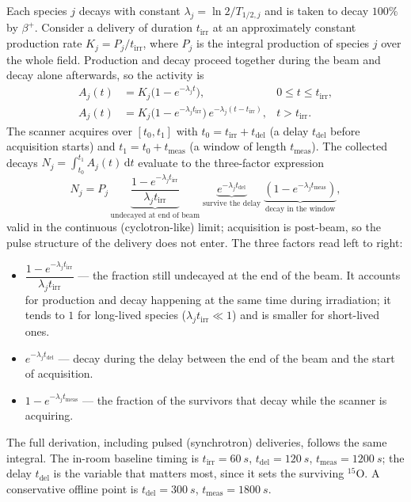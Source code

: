 \documentclass[11pt]{article}
\newcommand{\bplus}{\beta^{+}}
\newcommand{\Ox}[1]{{}^{#1}\mathrm{O}}
\newcommand{\tirr}{t_{\mathrm{irr}}}
\newcommand{\tdel}{t_{\mathrm{del}}}
\newcommand{\tmeas}{t_{\mathrm{meas}}}
\begin{document}
Each species $j$ decays with constant $\lambda_j=\ln 2/T_{1/2,j}$ and is taken to
decay $100\%$ by $\bplus$. Consider a delivery of duration $\tirr$ at an
approximately constant production rate $K_j=P_j/\tirr$, where $P_j$ is the integral
production of species $j$ over the whole field. Production and decay proceed
together during the beam and decay alone afterwards, so the activity is
\begin{align}
A_j(t) &= K_j\bigl(1-e^{-\lambda_j t}\bigr), & 0\le t\le \tirr,\\
A_j(t) &= K_j\bigl(1-e^{-\lambda_j \tirr}\bigr)\,e^{-\lambda_j (t-\tirr)}, & t>\tirr.
\end{align}
The scanner acquires over $[t_0,t_1]$ with $t_0=\tirr+\tdel$ (a delay $\tdel$
before acquisition starts) and $t_1=t_0+\tmeas$ (a window of length $\tmeas$). The
collected decays $N_j=\int_{t_0}^{t_1}A_j(t)\,\mathrm dt$ evaluate to the
three-factor expression
\begin{equation}
N_{j} =
P_j \,
\underbrace{\frac{1-e^{-\lambda_j \tirr}}{\lambda_j \tirr}}_{\text{undecayed at end of beam}}
\;
\underbrace{e^{-\lambda_j \tdel}}_{\text{survive the delay}}
\;
\underbrace{\left(1-e^{-\lambda_j \tmeas}\right)}_{\text{decay in the window}} ,
\label{eq:nmeas}
\end{equation}
valid in the continuous (cyclotron-like) limit; acquisition is post-beam, so the
pulse structure of the delivery does not enter. The three factors read left to
right:
\begin{itemize}[nosep]
\item $\dfrac{1-e^{-\lambda_j \tirr}}{\lambda_j \tirr}$ --- the
fraction still undecayed at the end of the beam. It accounts for production and decay
happening at the same time during irradiation; it tends to $1$ for long-lived species
($\lambda_j \tirr\ll 1$) and is smaller for short-lived ones.
\item $e^{-\lambda_j \tdel}$ --- decay during the delay between the end of
the beam and the start of acquisition.
\item $1-e^{-\lambda_j \tmeas}$ --- the fraction of the survivors that
decay while the scanner is acquiring.
\end{itemize}
The full derivation, including pulsed (synchrotron) deliveries, follows the same
integral. The in-room baseline timing is $\tirr=\SI{60}{s}$, $\tdel=\SI{120}{s}$,
$\tmeas=\SI{1200}{s}$; the delay $\tdel$ is the variable that matters most, since it
sets the surviving $\Ox{15}$. A conservative offline point is $\tdel=\SI{300}{s}$,
$\tmeas=\SI{1800}{s}$.
\end{document}
